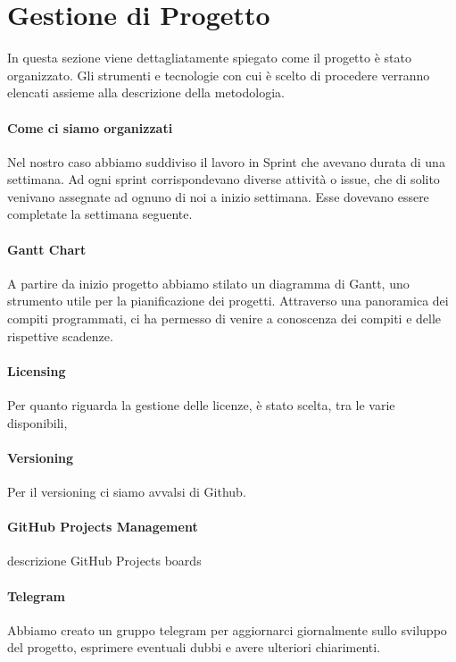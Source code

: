 \section{Gestione di Progetto}
In questa sezione viene dettagliatamente spiegato come il progetto è stato organizzato. Gli strumenti e tecnologie con cui è scelto di procedere verranno elencati assieme alla descrizione della metodologia.
    \paragraph{Come ci siamo organizzati}
    Nel nostro caso abbiamo suddiviso il lavoro in Sprint che avevano durata di una settimana. Ad ogni sprint corrispondevano diverse attività o issue, che di solito venivano assegnate ad ognuno di noi a inizio settimana. Esse dovevano essere completate la settimana seguente. 
    
    \paragraph{Gantt Chart} 
    A partire da inizio progetto abbiamo stilato un diagramma di Gantt, uno strumento utile per la pianificazione dei progetti. Attraverso una panoramica dei compiti programmati, ci ha permesso di venire a conoscenza dei compiti e delle rispettive scadenze.
    
    
    \paragraph{Licensing} Per quanto riguarda la gestione delle licenze, è stato scelta, tra le varie disponibili, 
    
    \paragraph{Versioning}
    Per il versioning ci siamo avvalsi di Github. 
    
    \paragraph{GitHub Projects Management}
    descrizione GitHub Projects boards 
    
    \paragraph{Telegram}
    Abbiamo creato un gruppo telegram per aggiornarci giornalmente sullo sviluppo del progetto, esprimere eventuali dubbi e avere ulteriori chiarimenti. 
    
